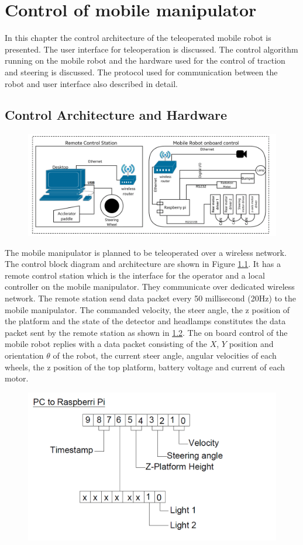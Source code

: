 \chapter{Control of mobile manipulator }
\label{c5_DI2}
In this chapter the control architecture of the teleoperated  mobile robot is presented. The user interface for teleoperation is discussed. The control algorithm  running on the mobile robot and the hardware used for the control of traction and steering is discussed. The protocol used  for communication between the robot and user interface also described in detail.
\section{Control Architecture and Hardware}


\begin{figure}
	\includegraphics[width=\linewidth,keepaspectratio]{Chapter3/fig/controlblock}
	\label{fig:ControlBlockDiag} 
\end{figure} 
The mobile manipulator is planned to be teleoperated over a wireless network. The control block diagram and architecture are shown in Figure \ref{fig:ControlBlockDiag}. It has a remote control station which is the interface for the operator and a local controller on the mobile manipulator. They  communicate over dedicated wireless network. The remote station send data packet every 50 millisecond (20Hz) to the mobile manipulator. The commanded velocity, the steer angle, the z position of the platform and the state of the detector and headlamps constitutes the data packet sent by the remote station as shown in \ref{fig:sentBytes}. The on board control of the mobile robot replies with a data packet consisting of the $X$, $Y$ position and orientation $\theta$ of the robot, the current steer angle, angular velocities of each wheels, the z position of the top platform,  battery voltage  and current of each motor.
\begin{figure}
	\includegraphics[width=.5\linewidth,keepaspectratio]{Chapter5/fig/bitconfig}
	\label{fig:sentBytes} 
\end{figure}

